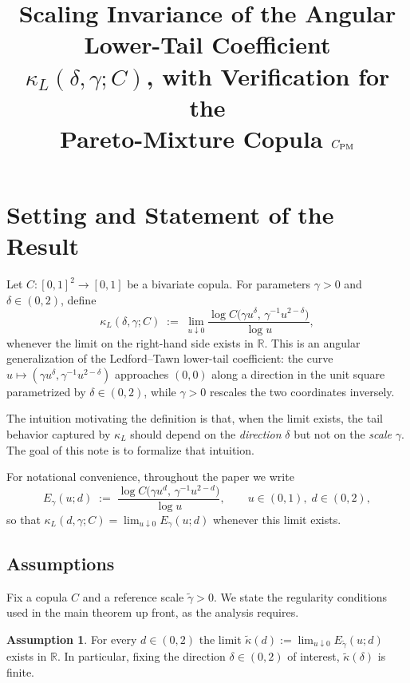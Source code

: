 \documentclass[11pt]{article}
\title{Scaling Invariance of the Angular Lower-Tail Coefficient \\
$\kappa_L(\delta,\gamma;C)$, with Verification for the \\
Pareto-Mixture Copula $C_{\mathrm{PM}}$}
\author{}
\date{}
\theoremstyle{definition}
\newtheorem{assumption}[theorem]{Assumption}
\newcommand{\R}{\mathbb{R}}
\begin{document}
\maketitle

\section{Setting and Statement of the Result}

Let $C:[0,1]^2\to[0,1]$ be a bivariate copula. For parameters
$\gamma>0$ and $\delta\in(0,2)$, define
\begin{equation}\label{eq:kappa-def}
\kappa_L(\delta,\gamma;C)
\;:=\;
\lim_{u\downarrow 0}
\frac{\log C\!\bigl(\gamma u^{\delta},\,\gamma^{-1}u^{2-\delta}\bigr)}{\log u},
\end{equation}
whenever the limit on the right-hand side exists in $\R$. This is an
angular generalization of the Ledford--Tawn lower-tail coefficient:
the curve $u\mapsto(\gamma u^{\delta},\gamma^{-1}u^{2-\delta})$
approaches $(0,0)$ along a direction in the unit square parametrized
by $\delta\in(0,2)$, while $\gamma>0$ rescales the two coordinates
inversely.

The intuition motivating the definition is that, when the limit
exists, the tail behavior captured by $\kappa_L$ should depend on the
\emph{direction} $\delta$ but not on the \emph{scale} $\gamma$. The
goal of this note is to formalize that intuition.

For notational convenience, throughout the paper we write
\begin{equation}\label{eq:Edef}
E_\gamma(u;d)
\;:=\;
\frac{\log C\!\bigl(\gamma u^{d},\,\gamma^{-1}u^{2-d}\bigr)}{\log u},
\qquad u\in(0,1),\;d\in(0,2),
\end{equation}
so that $\kappa_L(d,\gamma;C)=\lim_{u\downarrow 0}E_\gamma(u;d)$
whenever this limit exists.

\subsection{Assumptions}

Fix a copula $C$ and a reference scale $\tilde\gamma>0$. We state the
regularity conditions used in the main theorem up front, as the
analysis requires.

\begin{assumption}\label{ass:limit}
For every $d\in(0,2)$ the limit
$\tilde\kappa(d):=\lim_{u\downarrow 0}E_{\tilde\gamma}(u;d)$ exists in
$\R$. In particular, fixing the direction $\delta\in(0,2)$ of interest,
$\tilde\kappa(\delta)$ is finite.
\end{assumption}
\end{document}
